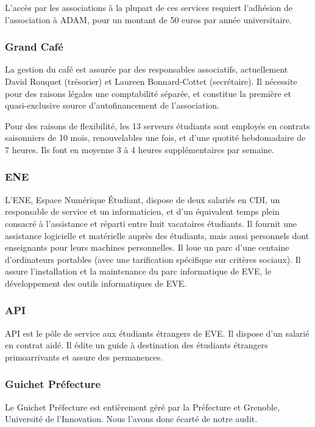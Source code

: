 L'accès par les associations à la plupart de ces services requiert l'adhésion
de l'association à ADAM, pour un montant de 50 euros par année universitaire.

\subsubsection{Grand Café}

La gestion du café est assurée par des responsables associatifs, actuellement
David Rouquet (trésorier) et Laureen Bonnard-Cottet (secrétaire).
Il nécessite pour des raisons légales une comptabilité séparée,
et constitue la première et quasi-exclusive source d'autofinancement de
l'association.

Pour des raisons de flexibilité, les 13 serveurs étudiants sont employés en
contrats saisonniers de 10 mois, renouvelables une fois, et d'une quotité
hebdomadaire de 7 heures. Ils font en moyenne 3 à 4 heures supplémentaires
par semaine.

\subsubsection{ENE}

L'ENE, Espace Numérique Étudiant, dispose de deux salariés en CDI, un
responsable de service et un informaticien, et d'un équivalent temps plein
consacré à l'assistance et réparti entre huit vacataires étudiants.
Il fournit une assistance logicielle et matérielle auprès des étudiants,
mais aussi personnels dont enseignants pour leurs machines personnelles.
Il loue un parc d'une centaine d'ordinateurs portables (avec une tarification
spécifique sur critères sociaux). Il assure l'installation et la maintenance
du parc informatique de EVE, le développement des outils informatiques de EVE.

\subsubsection{API}

API est le pôle de service aux étudiants étrangers de EVE.
Il dispose d'un salarié en contrat aidé. Il édite un guide à destination des
étudiants étrangers primoarrivants et assure des permanences.

\subsubsection{Guichet Préfecture}

Le Guichet Préfecture est entièrement géré par la Préfecture et Grenoble, Université de l'Innovation.
Nous l'avons donc écarté de notre audit.

